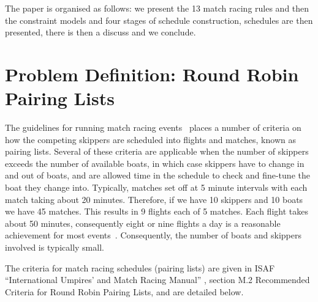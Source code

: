 \documentclass{llncs}
\begin{document}
The paper is organised as follows: we present the 13 match racing rules and then the constraint models and four stages of schedule construction, schedules are then presented, there is then a discuss and we conclude.


\section{Problem Definition: Round Robin Pairing Lists}\label{sec:definition}
The guidelines for running match racing events~\cite{isaf} places a number of criteria on how the competing skippers are scheduled into flights and matches, known as pairing lists. Several of these criteria are applicable when the number of skippers exceeds the number of available boats, in which case skippers have to change in and out of boats, and are allowed time in the schedule to check and fine-tune the boat they change into. Typically, matches set off at 5 minute intervals with each match taking about 20 minutes. Therefore, if we have 10 skippers and 10 boats we have 45 matches. This results in 9 flights each of 5 matches.  Each flight takes about 50 minutes, consequently eight or nine flights a day is a reasonable achievement for most events~\cite{isaf}. Consequently, the number of boats and skippers involved is typically small.

The criteria for  match racing schedules (pairing lists) are given in ISAF ``International Umpires' and Match Racing Manual'' \cite{isaf}, section
M.2 Recommended Criteria for Round Robin Pairing Lists, and are detailed below.
\end{document}
